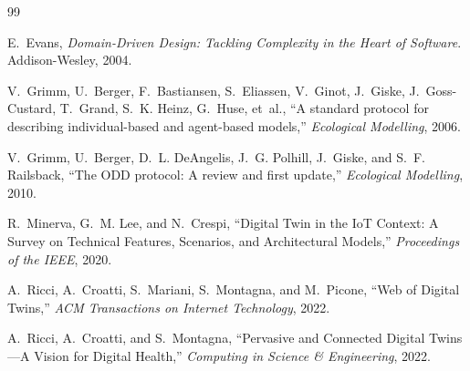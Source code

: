 \documentclass[12pt,a4paper,oneside]{article}
\begin{document}
\begin{thebibliography}{99}

E.~Evans, 
\emph{Domain-Driven Design: Tackling Complexity in the Heart of Software}.
\newblock Addison-Wesley, 2004.

V.~Grimm, U.~Berger, F.~Bastiansen, S.~Eliassen, V.~Ginot, J.~Giske, J.~Goss-Custard, T.~Grand, S.~K. Heinz, G.~Huse, et~al.,
\newblock ``A standard protocol for describing individual-based and agent-based models,''
\newblock \emph{Ecological Modelling}, 2006.

V.~Grimm, U.~Berger, D.~L. DeAngelis, J.~G. Polhill, J.~Giske, and S.~F. Railsback,
\newblock ``The ODD protocol: A review and first update,''
\newblock \emph{Ecological Modelling}, 2010.

R.~Minerva, G.~M. Lee, and N.~Crespi,
\newblock ``Digital Twin in the IoT Context: A Survey on Technical Features, Scenarios, and Architectural Models,''
\newblock \emph{Proceedings of the IEEE}, 2020.

A.~Ricci, A.~Croatti, S.~Mariani, S.~Montagna, and M.~Picone,
\newblock ``Web of Digital Twins,''
\newblock \emph{ACM Transactions on Internet Technology}, 2022.

A.~Ricci, A.~Croatti, and S.~Montagna,
\newblock ``Pervasive and Connected Digital Twins---A Vision for Digital Health,''
\newblock \emph{Computing in Science \& Engineering}, 2022.

\end{thebibliography}
\end{document}
